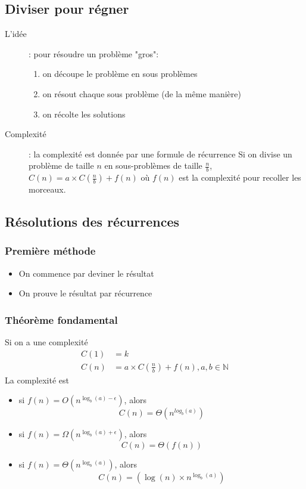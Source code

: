 \documentclass[10pt,a4paper]{article}
\begin{document}
	\subsection{Diviser pour régner}
		\begin{description}
			\item[L'idée]: pour résoudre un problème "gros":
				\begin{enumerate}
					\item on découpe le problème en sous problèmes
					\item on résout chaque sous problème (de la même manière)
					\item on récolte les solutions
				\end{enumerate}
			\item[Complexité]: la complexité est donnée par une formule de récurrence
				Si on divise un problème de taille $n$ en sous-problèmes de taille $\frac{n}{b}$, $\displaystyle C(n) = a\times C\left(\frac{n}{b}\right) + f(n)$ où $f(n)$ est la complexité pour recoller les morceaux.
		\end{description}
	\subsection{Résolutions des récurrences}
		\subsubsection{Première méthode}
			\begin{itemize}
				\item On commence par deviner le résultat
				\item On prouve le résultat par récurrence
			\end{itemize}
		\subsubsection{Théorème fondamental}
			Si on a une complexité\begin{align*}
			 C(1) &= k\\
			 C(n) &= a\times C\left(\frac{n}{b}\right) + f(n), a,b\in\mathbb{N}
			\end{align*}
			La complexité est
			\begin{itemize}
				\item si $\displaystyle f(n) = O\left(n^{\log_b(a)-\epsilon}\right)$, alors \[C(n) = \Theta\left(n^{log_b(a)}\right)\]
				\item si $\displaystyle f(n) = \Omega\left(n^{\log_b(a)+\epsilon}\right)$, alors \[C(n) = \Theta(f(n))\]
				\item si $\displaystyle f(n) = \Theta\left(n^{\log_b(a)}\right)$, alors \[C(n) = \left(\log(n)\times n^{\log_b(a)}\right)\]
			\end{itemize}
\end{document}
